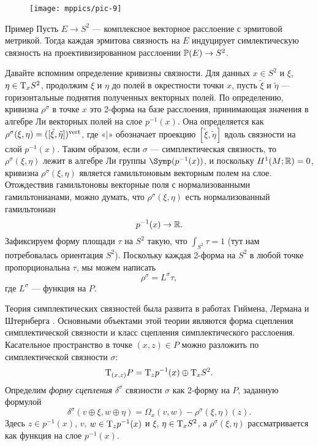 {

\begin{wrapfigure}[12]{o}{40 mm}
\vskip-0mm
\centering
\texttt{[image: mppics/pic-9]}
\caption{}\label{pic-9}
\vskip0mm
\end{wrapfigure}

\begin{ex*}{Пример}
Пусть $E \to S^2$ — комплексное векторное расслоение с эрмитовой метрикой.
Тогда каждая эрмитова связность на $E$ индуцирует симлектическую связность на проективизированном расслоении $\PP(E)\z\to S^2$.
\end{ex*}

Давайте вспомним определение кривизны связности.
Для данных $x\in S^2$ и $\xi$, $\eta \z\in \T_x S^2$, продолжим $\xi$
и $\eta$ до полей в окрестности точки $x$, 
пусть $\tilde\xi$ и $\tilde\eta$ — горизонтальные поднятия
полученных векторных полей. 
По определению, кривизна $\rho^\sigma$ в точке $x$ это 2-форма на
базе расслоения,
принимающая значения в алгебре Ли векторных полей на слое
$p^{-1}(x)$. 
Она определяется как $\rho^\sigma (\xi, \eta) \z= ([\tilde\xi,
  \tilde\eta])^\vert$, где «$\vert$» обозначает проекцию $[\tilde\xi,
  \tilde\eta]$ вдоль связности на слой $p^{-1} (x)$. 
Таким образом, если $\sigma$ — симплектическая связность, то
$\rho^\sigma (\xi, \eta)$ лежит в алгебре Ли группы
$\Symp(p^{-1}(x))$, и поскольку $H^1 (M;\mathbb{R}) = 0$, кривизна
$\rho^\sigma (\xi, \eta)$ является гамильтоновым векторным полем на
слое. 
Отождествив гамильтоновы векторные поля с нормализованными
гамильтонианами, можно думать, что $\rho^\sigma (\xi, \eta)$ есть
нормализованный гамильтониан 
\[p^{-1} (x) \to \mathbb{R}.\]
Зафиксируем форму площади $\tau$ на $S^2$ такую, что $\int_{S^2} \tau
= 1$ (тут нам потребовалась ориентация $S^2$). 
Поскольку каждая 2-форма на $S^2$ в любой точке
пропорциональна $\tau$, мы можем написать
\[\rho^\sigma = L^\sigma \tau,\]
где $L^\sigma$ — функция на $P$.

}

Теория симплектических связностей была развита в работах
Гиймена,
Лермана
и Штернберга \cite{GLS,MS}. 
Основными объектами этой теории являются форма сцепления
симплектической связности и класс сцепления симплектического
расслоения.  
Касательное пространство в точке $(x, z) \in P$ можно разложить по симплектической
связности $\sigma$: 
\[\mathrm{T}_{(x,z)} P = \mathrm{T}_z p^{-1} (x) \oplus \mathrm{T}_x S^2.\]
Определим \emph{форму сцепления} $\delta^\sigma$ связности $\sigma$
как 2-форму на $P$, заданную формулой  
\[\delta^\sigma (v \oplus \xi, w \oplus \eta) = \Omega_x (v, w) -
\rho^\sigma (\xi, \eta)(z).\] 
Здесь $z \in p^{-1} (x)$, $v$, $w \in \mathrm{T}_z p^{-1} (x)$ и $\xi$, $\eta
\in \mathrm{T}_x S^2$, а $\rho^\sigma (\xi, \eta)$ рассматривается как функция
на слое $p^{-1} (x)$. 

